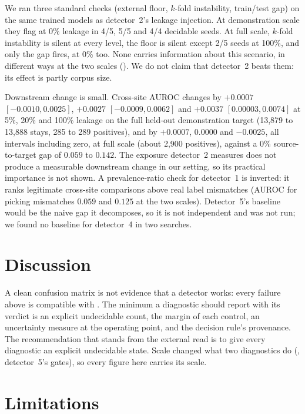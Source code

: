 \documentclass[pmlr,twocolumn,10pt]{jmlr}
\begin{document}
We ran three standard checks (external floor, $k$-fold instability, train/test
gap) on the same trained models as detector~2's leakage injection. At
demonstration scale they flag at 0\% leakage in 4/5, 5/5 and 4/4 decidable seeds.
At full scale, $k$-fold instability is silent at every level, the floor is silent
except 2/5 seeds at 100\%, and only the gap fires, at 0\% too. None carries
information about this scenario, in different ways at the two scales
(). We do not claim that detector~2 beats them: its
effect is partly corpus size.

Downstream change is small. Cross-site AUROC changes by $+0.0007$
$[-0.0010, 0.0025]$, $+0.0027$ $[-0.0009, 0.0062]$ and $+0.0037$
$[0.00003, 0.0074]$ at 5\%, 20\% and 100\% leakage on the full held-out
demonstration target (13{,}879 to 13{,}888 stays, 285 to 289 positives), and by $+0.0007$,
$0.0000$ and $-0.0025$, all intervals including zero, at full scale (about 2{,}900
positives), against a 0\% source-to-target gap of $0.059$ to $0.142$. The
exposure detector~2 measures does not produce a measurable downstream change in
our setting, so its practical importance is not shown. A prevalence-ratio check
for detector~1 is inverted: it ranks legitimate cross-site comparisons above
real label mismatches (AUROC for picking mismatches $0.059$ and $0.125$ at the
two scales). Detector~5's baseline would be the naive gap it decomposes, so it
is not independent and was not run; we found no baseline for detector~4 in two
searches.

\section{Discussion}
\label{sec:discussion}

A clean confusion matrix is not evidence that a detector works: every failure
above is compatible with . The minimum a diagnostic should
report with its verdict is an explicit undecidable count, the margin of each
control, an uncertainty measure at the operating point, and the decision rule's
provenance. The recommendation that stands from the external read is to give
every diagnostic an explicit undecidable state. Scale changed what two
diagnostics do (, detector~5's gates), so every figure
here carries its scale.

\section{Limitations}
\label{sec:limitations}
\end{document}
